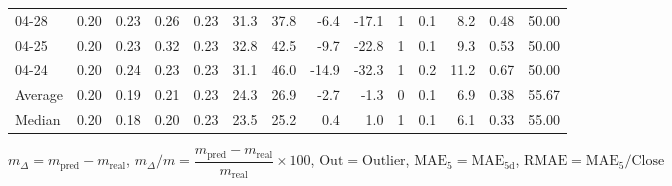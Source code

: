 \begin{threeparttable}
{\begin{tabular}{lrrrrrrrrrrrrr}
  04-28 &          0.20 &          0.23 &          0.26 &        0.23 &                31.3 &                37.8 &       -6.4 &        -17.1 &              1 &                 0.1 &              8.2 &            0.48 &                  50.00 \\
  04-25 &          0.20 &          0.23 &          0.32 &        0.23 &                32.8 &                42.5 &       -9.7 &        -22.8 &              1 &                 0.1 &              9.3 &            0.53 &                  50.00 \\
  04-24 &          0.20 &          0.24 &          0.23 &        0.23 &                31.1 &                46.0 &      -14.9 &        -32.3 &              1 &                 0.2 &             11.2 &            0.67 &                  50.00 \\
Average &          0.20 &          0.19 &          0.21 &        0.23 &                24.3 &                26.9 &       -2.7 &         -1.3 &              0 &                 0.1 &              6.9 &            0.38 &                  55.67 \\
 Median &          0.20 &          0.18 &          0.20 &        0.23 &                23.5 &                25.2 &        0.4 &          1.0 &              1 &                 0.1 &              6.1 &            0.33 &                  55.00 \\
\bottomrule
\end{tabular}
}
\begin{tablenotes}\footnotesize
\item $m_\Delta=m_{\text{pred}}-m_{\text{real}}$,
$m_\Delta/m=\dfrac{m_{\text{pred}}-m_{\text{real}}}{m_{\text{real}}}\times100$,
$\mathrm{Out}=\text{Outlier}$,
$\mathrm{MAE}_5=\mathrm{MAE}_{5\text{d}}$,
$\mathrm{RMAE}=\mathrm{MAE}_5/\text{Close}$
\end{tablenotes}
\end{threeparttable}
\endgroup

